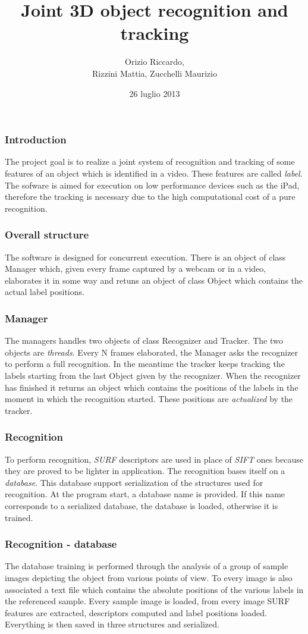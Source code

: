 \documentclass{beamer}
\title {Joint 3D object recognition and tracking}
\author [Orizio, Rizzini, Zucchelli]{Orizio Riccardo,\\Rizzini Mattia, Zucchelli Maurizio}
\date{26 luglio 2013}
\institute [UniBS]{Universit\`{a} degli Studi di Brescia}
\begin{document}
	\begin{frame}
		\maketitle
	\end{frame}
	
	\begin{frame}
		\frametitle{Introduction}
		The project goal is to realize a joint system of recognition and tracking of some features of an object which is identified in a video. These features are called \emph{label}.
		The sofware is aimed for execution on low performance devices such as the iPad, therefore the tracking is necessary due to the high computational cost of a pure recognition.
	\end{frame}

	
	\begin{frame}
		\frametitle{Overall structure}
		The software is designed for concurrent execution.
		There is an object of class Manager which, given every frame captured by a webcam or in a video, elaborates it in some way and retuns an object of class Object which contains the actual label positions.
	\end{frame}

	\begin{frame}
		\frametitle{Manager}
		The managers handles two objects of class Recognizer and Tracker. The two objects are \emph{threads}.
		Every N frames elaborated, the Manager asks the recognizer to perform a full recognition. In the meantime the tracker keeps tracking the labels starting from the last Object given by the recognizer.
		When the recognizer has finished it returns an object which contains the positions of the labels in the moment in which the recognition started. These positions are \emph{actualized} by the tracker.
	\end{frame}

	\begin{frame}
		\frametitle{Recognition}
		To perform recognition, \emph{SURF} descriptors are used in place of \emph{SIFT} ones because they are proved to be lighter in application.
		The recognition bases itself on a \emph{database}.
		This database support serialization of the structures used for recognition. At the program start, a database name is provided. If this name corresponds to a serialized database, the database is loaded, otherwise it is trained.
	\end{frame}

	\begin{frame}
	\frametitle{Recognition - database}
		The database training is performed through the analysis of a group of sample images depicting the object from various points of view.
		To every image is also associated a text file which contains the absolute positions of the various labels in the referenced sample.
		Every sample image is loaded, from every image SURF features are extracted, descriptors computed and label positions loaded. Everything is then saved in three structures and serialized.
	\end{frame}
\end{document}
